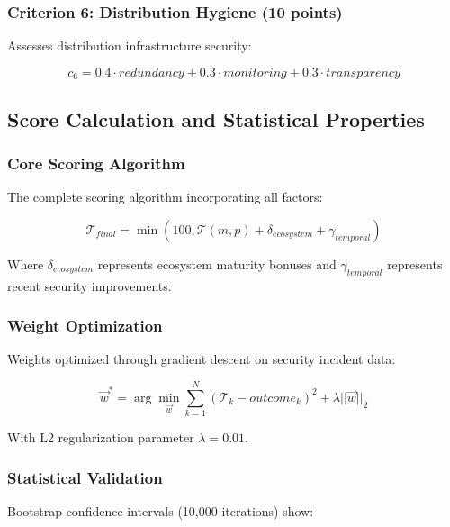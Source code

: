\documentclass[11pt,a4paper]{article}
\begin{document}
\subsubsection{Criterion 6: Distribution Hygiene (10 points)}

Assesses distribution infrastructure security:

\begin{equation}
c_6 = 0.4 \cdot redundancy + 0.3 \cdot monitoring + 0.3 \cdot transparency
\end{equation}

\subsection{Score Calculation and Statistical Properties}

\subsubsection{Core Scoring Algorithm}

The complete scoring algorithm incorporating all factors:

\begin{equation}
\mathcal{T}_{final} = \min(100, \mathcal{T}(m,p) + \delta_{ecosystem} + \gamma_{temporal})
\end{equation}

Where $\delta_{ecosystem}$ represents ecosystem maturity bonuses and $\gamma_{temporal}$ represents recent security improvements.

\subsubsection{Weight Optimization}

Weights optimized through gradient descent on security incident data:

\begin{equation}
\vec{w}^* = \arg\min_{\vec{w}} \sum_{k=1}^{N} (\mathcal{T}_k - outcome_k)^2 + \lambda||\vec{w}||_2
\end{equation}

With L2 regularization parameter $\lambda = 0.01$.

\subsubsection{Statistical Validation}

Bootstrap confidence intervals (10,000 iterations) show:
\end{document}
